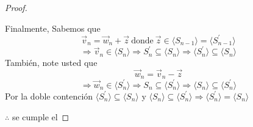 \begin{proof}
\begin{enumerate}
   Finalmente, Sabemos que $$\vec{v}_n=\vec{w}_n+\vec{z} \ \text{donde} \ \vec{z} \in \langle S_{n-1} \rangle=\langle {S}^{\prime}_{n-1} \rangle$$ $$\Rightarrow \vec{v}_n \in \langle S_n \rangle \Rightarrow {S}^{\prime}_n \subseteq \langle S_n \rangle \Rightarrow \langle {S}^{\prime}_n \rangle \subseteq \langle S_n \rangle$$ También, note usted que $$\vec{w}_n=\vec{v}_n-\vec{z}$$ $$\Rightarrow \vec{w}_n \in \langle {S}^{\prime}_n \rangle \Rightarrow S_n \subseteq \langle {S}^{\prime}_n \rangle \Rightarrow \langle S_n \rangle \subseteq \langle {S}^{\prime}_n \rangle$$ Por la doble contención $\langle {S}^{\prime}_n \rangle \subseteq \langle S_n \rangle $ y $ \langle S_n \rangle \subseteq \langle {S}^{\prime}_n \rangle \Rightarrow \langle {S}^{\prime}_n \rangle=\langle S_n \rangle$
\end{enumerate}
   $\therefore$ se cumple el  
\end{proof}
